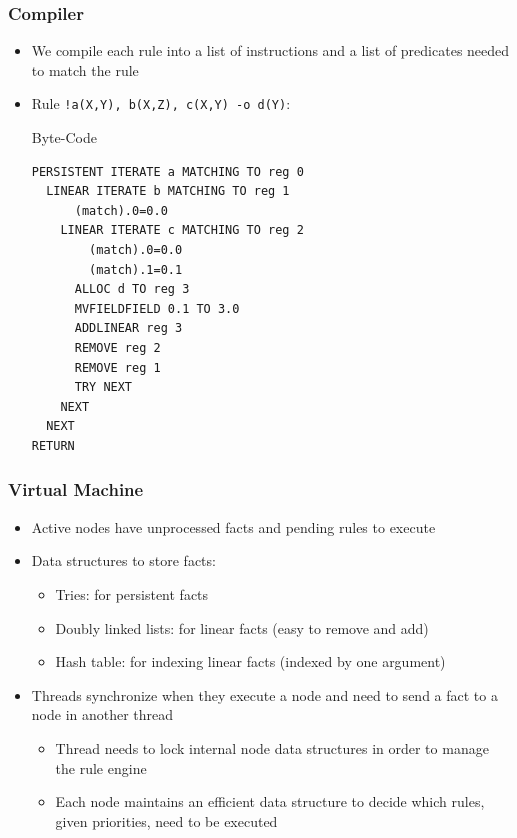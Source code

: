 \documentclass{beamer}
\begin{document}
\begin{frame}[fragile]
   \frametitle{Compiler}
   \begin{itemize}
      \item We compile each rule into a list of instructions and a list of predicates needed to match the rule
      \item Rule \texttt{!a(X,Y), b(X,Z), c(X,Y) -o d(Y)}:
      \begin{block}{Byte-Code}
         \scriptsize\begin{verbatim}
PERSISTENT ITERATE a MATCHING TO reg 0
  LINEAR ITERATE b MATCHING TO reg 1
      (match).0=0.0
    LINEAR ITERATE c MATCHING TO reg 2
        (match).0=0.0
        (match).1=0.1
      ALLOC d TO reg 3
      MVFIELDFIELD 0.1 TO 3.0
      ADDLINEAR reg 3
      REMOVE reg 2
      REMOVE reg 1
      TRY NEXT
    NEXT
  NEXT
RETURN
         \end{verbatim}
      \end{block}
   \end{itemize}
\end{frame}

\begin{frame}[fragile]
   \frametitle{Virtual Machine}
   \begin{itemize}
      \item Active nodes have unprocessed facts and pending rules to execute
      \item Data structures to store facts:
      \begin{itemize}
         \item Tries: for persistent facts
         \item Doubly linked lists: for linear facts (easy to remove and add)
         \item Hash table: for indexing linear facts (indexed by one argument)
      \end{itemize}
      \item Threads synchronize when they execute a node and need to send a fact to a node in another thread
      \begin{itemize}
         \item Thread needs to lock internal node data structures in order to manage the rule engine
         \item Each node maintains an efficient data structure to decide which rules, given priorities, need to be executed 
      \end{itemize}
   \end{itemize}
\end{frame}
\end{document}

